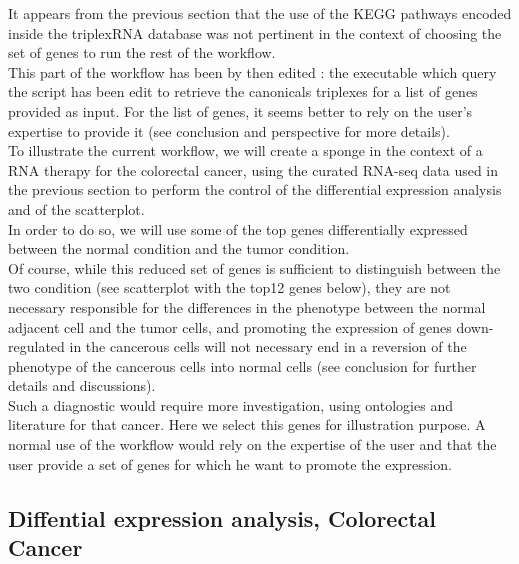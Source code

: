 \documentclass[a4paper,12pt]{report}
\begin{document}
It appears from the previous section that the use of the KEGG pathways encoded inside the triplexRNA database was not pertinent in the context of choosing the set of genes to run the rest of the workflow.\\

This part of the workflow has been by then edited : the executable which query the script has been edit to retrieve the canonicals triplexes for a list of genes provided as input. For the list of genes, it seems better to rely on the user's expertise to provide it (see conclusion and perspective for more details).\\

To illustrate the current workflow, we will create a sponge in the context of a RNA therapy for the colorectal cancer, using the curated RNA-seq data\cite{curated} used in the previous section to perform the control of the differential expression analysis and of the scatterplot.\\

In order to do so, we will use some of the top genes differentially expressed between the normal condition and the tumor condition.\\

Of course, while this reduced set of genes is sufficient to distinguish between the two condition (see scatterplot with the top12 genes below), they are not necessary responsible for the differences in the phenotype between the normal adjacent cell and the tumor cells, and promoting the expression of genes down-regulated in the cancerous cells will not necessary end in a reversion of the phenotype of the cancerous cells into normal cells (see conclusion for further details and discussions).\\

Such a diagnostic would require more investigation, using ontologies and literature for that cancer\cite{colorectal}. Here we select this genes for illustration purpose. A normal use of the workflow would rely on the expertise of the user and that the user provide a set of genes for which he want to promote the expression.\\

\subsection{Diffential expression analysis, Colorectal Cancer}
\end{document}
